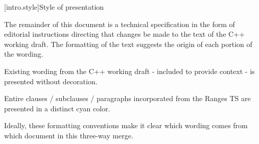 [intro.style]{Style of presentation}

\pnum
The remainder of this document is a technical specification in the form of
editorial instructions directing that changes be made to the text of the C++
working draft. The formatting of the text suggests the origin of each portion of
the wording.

Existing wording from the C++ working draft - included to provide context - is
presented without decoration.

\begin{addedblock}
Entire clauses / subclauses / paragraphs incorporated from the Ranges TS are
presented in a distinct cyan color.
\end{addedblock}





Ideally, these formatting conventions make it clear which wording comes from
which document in this three-way merge.
